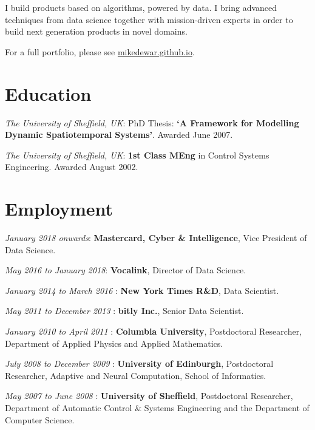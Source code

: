 \documentclass[line, overlapped]{res}
\begin{document}

\address{
London\\
mikedewar@gmail.com
}

\begin{resume}




I build products based on algorithms, powered by data. I bring advanced
techniques from data science together with mission-driven experts in
order to build next generation products in novel domains.

	For a full portfolio, please see \href{https://mikedewar.github.io}{mikedewar.github.io}.

\section{Education}

\emph{The University of Sheffield, UK}: PhD Thesis: \textbf{`A
  Framework for Modelling Dynamic Spatiotemporal Systems'}. Awarded June
  2007. 

\emph{The University of Sheffield, UK}: \textbf{1st Class MEng} in
  Control Systems Engineering. Awarded August 2002.

\section{Employment}

  \emph{January 2018 onwards}: \textbf{Mastercard, Cyber \&
  Intelligence}, Vice President of Data Science.

  \emph{May 2016 to January 2018}: \textbf{Vocalink}, Director of Data
  Science.

  \emph{January 2014 to March 2016} : \textbf{New York Times R\&D}, Data
  Scientist.

  \emph{May 2011 to December 2013} : \textbf{bitly Inc.}, Senior Data
  Scientist.

  \emph{January 2010 to April 2011} : \textbf{Columbia University},
  Postdoctoral Researcher, Department of Applied Physics and Applied
  Mathematics.

  \emph{July 2008 to December 2009} : \textbf{University of Edinburgh},
  Postdoctoral Researcher, Adaptive and Neural Computation, School of
  Informatics.

  \emph{May 2007 to June 2008} : \textbf{University of Sheffield},
  Postdoctoral Researcher, Department of Automatic Control \& Systems
  Engineering and the Department of Computer Science.


\end{resume}
\end{document}
